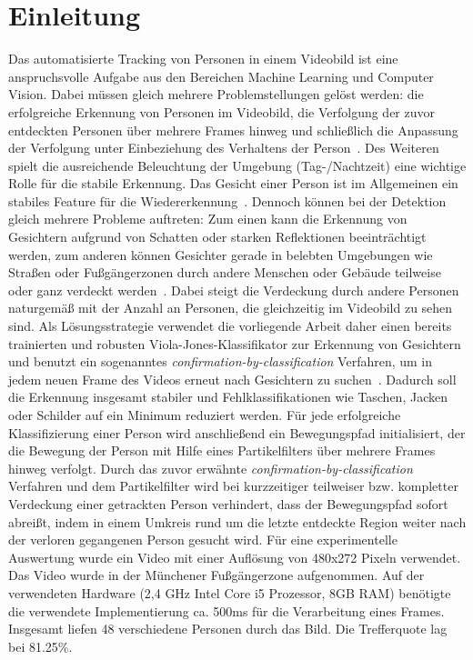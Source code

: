\documentclass[a4paper, 11pt, twocolumn]{article}
\begin{document}
\section{Einleitung} %
\label{sec:einleitung}
Das automatisierte Tracking von Personen in einem Videobild ist eine anspruchsvolle Aufgabe aus den Bereichen Machine Learning und Computer Vision. Dabei müssen gleich mehrere Problemstellungen gelöst werden: die erfolgreiche Erkennung von Personen im Videobild, die Verfolgung der zuvor entdeckten Personen über mehrere Frames hinweg und schließlich die Anpassung der Verfolgung unter Einbeziehung des Verhaltens der Person~\cite{Yilmaz2006}. 
Des Weiteren spielt die ausreichende Beleuchtung der Umgebung (Tag-/Nachtzeit) eine wichtige Rolle für die stabile Erkennung.
Das Gesicht einer Person ist im Allgemeinen ein stabiles Feature für die Wiedererkennung~\cite{ViolaRobustObject2001}. Dennoch können bei der Detektion gleich mehrere Probleme auftreten: 
Zum einen kann die Erkennung von Gesichtern aufgrund von Schatten oder starken Reflektionen beeinträchtigt werden, zum anderen können Gesichter gerade in belebten Umgebungen wie Straßen oder Fußgängerzonen durch andere Menschen oder Gebäude teilweise oder ganz verdeckt werden~\cite{aliMultipleHuman}. Dabei steigt die Verdeckung durch andere Personen naturgemäß mit der Anzahl an Personen, die gleichzeitig im Videobild zu sehen sind.
Als Lösungsstrategie verwendet die vorliegende Arbeit daher einen bereits trainierten und robusten Viola-Jones-Klassifikator zur Erkennung von Gesichtern und benutzt ein sogenanntes \emph{confirmation-by-classification} Verfahren, um in jedem neuen Frame des Videos erneut nach Gesichtern zu suchen~\cite{aliMultipleHuman}. Dadurch soll die Erkennung insgesamt stabiler und Fehlklassifikationen wie Taschen, Jacken oder Schilder auf ein Minimum reduziert werden. 
Für jede erfolgreiche Klassifizierung einer Person wird anschließend ein Bewegungspfad initialisiert, der die Bewegung der Person mit Hilfe eines Partikelfilters über mehrere Frames hinweg verfolgt. Durch das zuvor erwähnte \emph{confirmation-by-classification} Verfahren und dem Partikelfilter wird bei kurzzeitiger teilweiser bzw. kompletter Verdeckung einer getrackten Person verhindert, dass der Bewegungspfad sofort abreißt, indem in einem Umkreis rund um die letzte entdeckte Region weiter nach der verloren gegangenen Person gesucht wird.
Für eine experimentelle Auswertung wurde ein Video mit einer Auflösung von 480x272 Pixeln verwendet. Das Video wurde in der Münchener Fußgängerzone aufgenommen. Auf der verwendeten Hardware (2,4 GHz Intel Core i5 Prozessor, 8GB RAM) benötigte die verwendete Implementierung ca. 500ms für die Verarbeitung eines Frames. Insgesamt liefen 48 verschiedene Personen durch das Bild. Die Trefferquote lag bei 81.25\%. 
\end{document}
